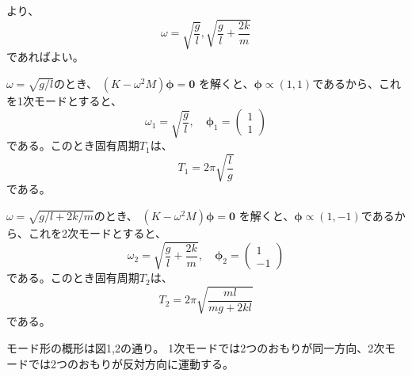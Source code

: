 \documentclass[a4paper]{jsarticle}
\begin{document}
より、
\begin{equation}
  \omega = \sqrt{\frac{g}{l}}, \sqrt{\frac{g}{l} + \frac{2k}{m}}
\end{equation}
であればよい。\par
$\omega = \sqrt{g/l}$のとき、
$(K - \omega^2 M) \boldsymbol{\phi} = \boldsymbol{0}$
を解くと、$\boldsymbol{\phi} \propto (1, 1)$であるから、これを1次モードとすると、
\begin{equation}
  \omega_1 = \sqrt{\frac{g}{l}},\quad
  \boldsymbol{\phi}_1 =
  \begin{pmatrix}
    1 \\ 1
  \end{pmatrix}
\end{equation}
である。このとき固有周期$T_1$は、
\begin{equation}
  T_1 = 2 \pi \sqrt{\frac{l}{g}}
\end{equation}
である。\par
$\omega = \sqrt{g/l + 2k/m}$のとき、
$(K - \omega^2 M) \boldsymbol{\phi} = \boldsymbol{0}$
を解くと、$\boldsymbol{\phi} \propto (1, -1)$であるから、これを2次モードとすると、
\begin{equation}
  \omega_2 = \sqrt{\frac{g}{l} + \frac{2k}{m}},\quad
  \boldsymbol{\phi}_2 =
  \begin{pmatrix}
    1 \\ -1
  \end{pmatrix}
\end{equation}
である。このとき固有周期$T_2$は、
\begin{equation}
  T_2 = 2 \pi \sqrt{\frac{ml}{mg + 2kl}}
\end{equation}
である。\par
モード形の概形は図1,2の通り。
1次モードでは2つのおもりが同一方向、2次モードでは2つのおもりが反対方向に運動する。
\end{document}

